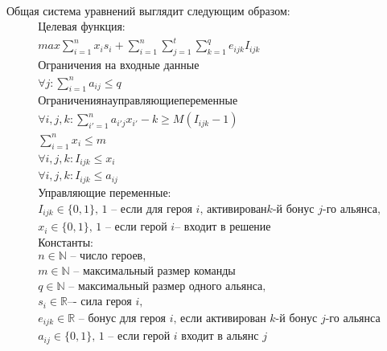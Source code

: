 \documentclass{article}
\begin{document}
 
Общая система уравнений выглядит следующим образом:
\begin{equation}
\begin{gathered}
\textbf{Целевая функция:}\\
max \sum_{i=1}^{n} x_i s_i + \sum_{i=1}^{n} \sum_{j=1}^{t}  \sum_{k=1}^{q} e_{ijk} I_{ijk} \\

\textbf{Ограничения на входные данные}\\
    
\forall{j} : \sum_{i=1}^n a_{ij} \le q \\

Ограничения на управляющие переменные \\
\forall{i,j,k} :  \sum_{i'=1}^{n} a_{i'j} x_{i'} - k \ge M( I_{ijk}  - 1) \\
\sum_{i=1}^n x_i \le m   \\ 


\forall{i,j,k} :  I_{ijk}  \le x_i \\

\forall{i,j,k} :  I_{ijk}  \le a_{ij} \\

\text{Управляющие переменные:} \\
I_{ijk} \in \{0, 1\} \text {, 1 – если для героя } i \text{, активирован} k\text{-й бонус } j \text{-го альянса,} \\
x_i  \in \{0, 1\} \text{, 1 -- если герой } i \text{– входит в решение} \\

\textbf{Константы:} \\
n \in \mathbb{N} \text{ -- число героев,} \\
m \in \mathbb{N} \text{ -- максимальный размер команды}\\
q \in \mathbb{N} \text{ -- максимальный размер одного альянса,} \\

s_i  \in \mathbb{R} \text{–- сила героя } i, \\
e_{ijk} \in \mathbb{R} \text{ -- бонус для героя } i \text{,  если активирован } k
\text{-й бонус } j \text{-го альянса} \\
a_{ij} \in \{0, 1\} \text{, 1 -- если герой } i \text{ входит в альянс } j \\ 
\end{gathered}
\end{equation}
\end{document}
